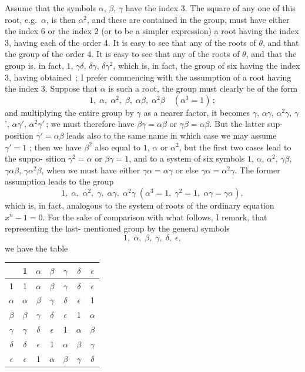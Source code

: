\documentclass[11pt,a4paper]{book}
\begin{document}
Assume that the symbols $\alpha$, $\beta$, $\gamma$ have the index 3. The square of any one of
this root, e.g.\ $\alpha$, is then $\alpha^2$, and these are contained in the group, must have either
the index 6 or the index 2 (or to be a simpler expression) a root having the index 3, having
each of the order 4. It is easy to see that any of the roots of $\theta$, and that the group
of the order 4. It is easy to see that any of the roots of $\theta$, and that the group
is, in fact, $1$, $\gamma\delta$, $\delta\gamma$, $\delta\gamma^2$, which is, in fact, the group of six having the index 3, having
obtained \,; I prefer commencing with the assumption of a root having the index 3.
Suppose that $\alpha$ is such a root, the group must clearly be of the form
\[
1,\;\alpha,\;\alpha^2,\;\beta,\;\alpha\beta,\;\alpha^2\beta\quad(\alpha^3=1)\,;
\]
and multiplying the entire group by $\gamma$ as a nearer factor, it becomes $\gamma$, $\alpha\gamma$, $\alpha^2\gamma$, $\gamma$',
$\alpha\gamma'$, $\alpha^2\gamma'$\,; we must therefore have $\beta\gamma = \alpha\beta$ or $\gamma\beta = \alpha\beta$. But the latter sup-
position $\gamma' = \alpha\beta$ leads also to the same name in which case we may assume $\gamma' = 1$ ;
then we have $\beta^2$ also equal to $1$, $\alpha$ or $\alpha^2$, but the first two cases lead to the suppo-
sition $\gamma^2 = \alpha$ or $\beta\gamma = 1$, and to a system of six symbols $1$, $\alpha$, $\alpha^2$, $\gamma\beta$, $\gamma\alpha\beta$, $\gamma\alpha^2\beta$,
when we must have either $\gamma\alpha = \alpha\gamma$ or else $\gamma\alpha = \alpha^2\gamma$. The former assumption leads to
the group
\[
1,\;\alpha,\;\alpha^2,\;\gamma,\;\alpha\gamma,\;\alpha^2\gamma\;(\alpha^3=1,\;\gamma^2=1,\;\alpha\gamma=\gamma\alpha),
\]
which is, in fact, analogous to the system of roots of the ordinary equation $x^n - 1 = 0$.
For the sake of comparison with what follows, I remark, that representing the last-
mentioned group by the general symbols
\[
1,\;\alpha,\;\beta,\;\gamma,\;\delta,\;\epsilon,
\]
we have the table
\medskip
\begin{center}
\begin{tabular}{c|cccccc}
 & 1 & $\alpha$ & $\beta$ & $\gamma$ & $\delta$ & $\epsilon$ \\\hline
1 & 1 & $\alpha$ & $\beta$ & $\gamma$ & $\delta$ & $\epsilon$ \\
$\alpha$ & $\alpha$ & $\beta$ & $\gamma$ & $\delta$ & $\epsilon$ & 1 \\
$\beta$ & $\beta$ & $\gamma$ & $\delta$ & $\epsilon$ & 1 & $\alpha$ \\
$\gamma$ & $\gamma$ & $\delta$ & $\epsilon$ & 1 & $\alpha$ & $\beta$ \\
$\delta$ & $\delta$ & $\epsilon$ & 1 & $\alpha$ & $\beta$ & $\gamma$ \\
$\epsilon$ & $\epsilon$ & 1 & $\alpha$ & $\beta$ & $\gamma$ & $\delta$
\end{tabular}
\end{center}
\end{document}
